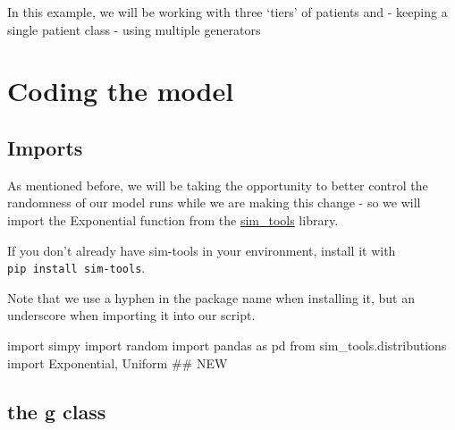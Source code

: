 \documentclass[
  letterpaper,
  DIV=11,
  numbers=noendperiod]{scrreprt}
\newenvironment{Shaded}{}{}
\newcommand{\CommentTok}[1]{\textcolor[rgb]{0.42,0.45,0.49}{#1}}
\newcommand{\ImportTok}[1]{\textcolor[rgb]{0.01,0.18,0.38}{#1}}
\newcommand{\NormalTok}[1]{\textcolor[rgb]{0.14,0.16,0.18}{#1}}
\begin{document}
In this example, we will be working with three `tiers' of patients and -
keeping a single patient class - using multiple generators

\section{Coding the model}\label{coding-the-model-2}

\subsection{Imports}\label{imports}

As mentioned before, we will be taking the opportunity to better control
the randomness of our model runs while we are making this change - so we
will import the Exponential function from the
\href{https://tommonks.github.io/sim-tools/00_front_page.html}{sim\_tools}
library.

\begin{tcolorbox}[enhanced jigsaw, colframe=quarto-callout-tip-color-frame, bottomtitle=1mm, breakable, rightrule=.15mm, coltitle=black, colbacktitle=quarto-callout-tip-color!10!white, opacityback=0, leftrule=.75mm, arc=.35mm, toptitle=1mm, title=\textcolor{quarto-callout-tip-color}{\faLightbulb}\hspace{0.5em}{Tip}, titlerule=0mm, colback=white, toprule=.15mm, bottomrule=.15mm, left=2mm, opacitybacktitle=0.6]

If you don't already have sim-tools in your environment, install it with
\texttt{pip\ install\ sim-tools}.

Note that we use a hyphen in the package name when installing it, but an
underscore when importing it into our script.

\end{tcolorbox}

\begin{Shaded}
\begin{Highlighting}[]
\ImportTok{import}\NormalTok{ simpy}
\ImportTok{import}\NormalTok{ random}
\ImportTok{import}\NormalTok{ pandas }\ImportTok{as}\NormalTok{ pd}
\ImportTok{from}\NormalTok{ sim\_tools.distributions }\ImportTok{import}\NormalTok{ Exponential, Uniform }\CommentTok{\#\# NEW}
\end{Highlighting}
\end{Shaded}

\subsection{the g class}\label{the-g-class-4}
\end{document}
